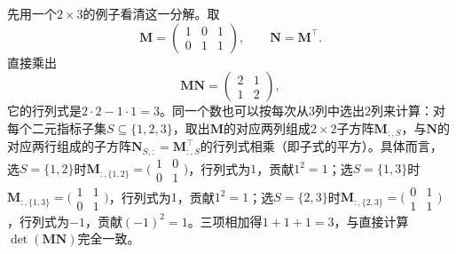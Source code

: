 先用一个$2\times 3$的例子看清这一分解。取
\[
 \bm M=\begin{pmatrix}1&0&1\\0&1&1\end{pmatrix},
 \qquad \bm N=\bm M^\top.
\]
直接乘出
\[
 \bm M\bm N=\begin{pmatrix}2&1\\1&2\end{pmatrix},
\]
它的行列式是$2\cdot 2-1\cdot 1=3$。同一个数也可以按每次从$3$列中选出$2$列来计算：对每个二元指标子集$S\subseteq\{1,2,3\}$，取出$\bm M$的对应两列组成$2\times 2$子方阵$\bm M_{:,S}$，与$\bm N$的对应两行组成的子方阵$\bm N_{S,:}=\bm M_{:,S}^\top$的行列式相乘（即子式的平方）。具体而言，选$S=\{1,2\}$时$\bm M_{:,\{1,2\}}=\bigl(\begin{smallmatrix}1&0\\0&1\end{smallmatrix}\bigr)$，行列式为$1$，贡献$1^2=1$；选$S=\{1,3\}$时$\bm M_{:,\{1,3\}}=\bigl(\begin{smallmatrix}1&1\\0&1\end{smallmatrix}\bigr)$，行列式为$1$，贡献$1^2=1$；选$S=\{2,3\}$时$\bm M_{:,\{2,3\}}=\bigl(\begin{smallmatrix}0&1\\1&1\end{smallmatrix}\bigr)$，行列式为$-1$，贡献$(-1)^2=1$。三项相加得$1+1+1=3$，与直接计算$\det(\bm M\bm N)$完全一致。


